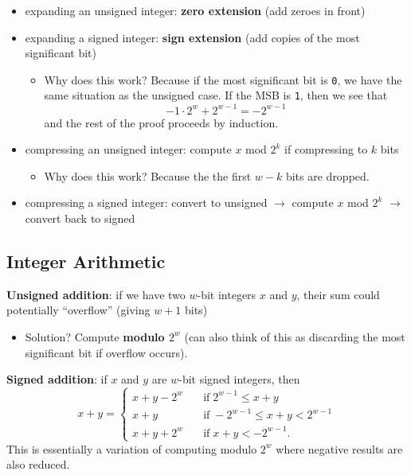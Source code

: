 \documentclass{article}
\theoremstyle{definition} %
\begin{document}
\begin{flushleft}
\begin{itemize}
    \item expanding an unsigned integer: \textbf{zero extension} (add zeroes in front)
    \item expanding a signed integer: \textbf{sign extension} (add copies of the most significant bit)
    \begin{itemize}
        \item Why does this work? Because if the most significant bit is \texttt{0}, we have the same situation as the unsigned case. If the MSB is \texttt{1}, then we see that
        \[
        -1 \cdot 2^w + 2^{w-1} = -2^{w-1}
        \]
        and the rest of the proof proceeds by induction.
    \end{itemize}
    \item compressing an unsigned integer: compute $x$ mod $2^k$ if compressing to $k$ bits
    \begin{itemize}
        \item Why does this work? Because the the first $w-k$ bits are dropped.
    \end{itemize}
    \item compressing a signed integer: convert to unsigned $\to$ compute $x$ mod $2^k$ $\to$ convert back to signed
\end{itemize}

\subsection{Integer Arithmetic}

\textbf{Unsigned addition}: if we have two $w$-bit integers $x$ and $y$, their sum could potentially ``overflow'' (giving $w+1$ bits)

\begin{itemize}
    \item Solution? Compute \textbf{modulo $2^w$} (can also think of this as discarding the most significant bit if overflow occurs).
\end{itemize}

\textbf{Signed addition}: if $x$ and $y$ are $w$-bit signed integers, then
\[
x + y = \begin{cases}
x + y - 2^w \quad &\text{if} \; 2^{w-1} \leq x + y \\
x + y \quad &\text{if} \; -2^{w-1} \leq x + y < 2^{w-1} \\
x + y + 2^w \quad &\text{if} \; x + y < -2^{w-1}.
\end{cases}
\]
This is essentially a variation of computing modulo $2^w$ where negative results are also reduced.


\end{flushleft}
\end{document}
